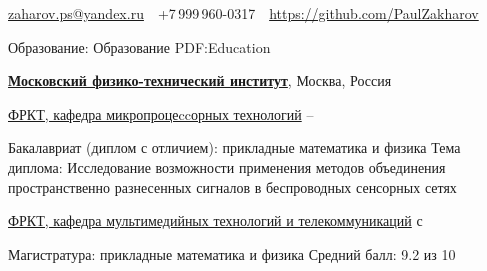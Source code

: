 \documentclass[a4paper, MMyyyy,nonstopmode]{simpleresumecv_ru}
\newcommand{\CVAuthor}{Павел Захаров}
\begin{document}

\Title{\CVAuthor}

\begin{SubTitle}
\href{mailto:zaharov.ps@yandex.ru}
{zaharov.ps@yandex.ru}
\,\SubBulletSymbol\,
+7\,999\,960-0317
\,\SubBulletSymbol\,
\href{https://github.com/PaulZakharov}
{https://github.com/PaulZakharov}
\end{SubTitle}

\begin{Body}


\Section
{Образование:}
{Образование}
{PDF:Education}

\Entry
\href{https://mipt.ru/}
{\textbf{Московский физико-технический институт}},
Москва, Россия

\Gap
\BulletItem
\href{https://mipt.ru/education/chairs/microprocessors/}
{ФРКТ, кафедра микропроцеccорных технологий}
\hfill
{} --
\begin{Detail}
\SubBulletItem
Бакалавриат (диплом с отличием): прикладные математика и физика
\SubBulletItem
Тема диплома: Исследование возможности применения методов
объединения пространственно разнесенных сигналов
в беспроводных сенсорных сетях
\end{Detail}

\BulletItem
\href{https://mipt.ru/drec/about/bases/multimedia_technology_and_telecommunications/}
{ФРКТ, кафедра мультимедийных технологий и телекоммуникаций}
\hfill
с 
\begin{Detail}
\SubBulletItem
Магистратура: прикладные математика и физика 
\SubBulletItem
Средний балл: 9.2 из 10
\end{Detail}
\Gap


\end{Body}
\end{document}
